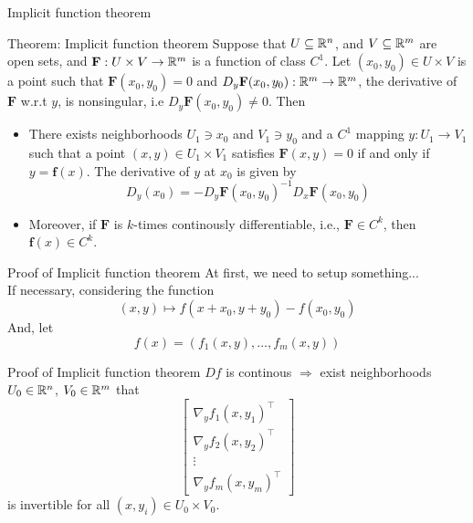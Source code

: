 \begin{frame}{Implicit function theorem}
    \begin{block}{Theorem: Implicit function theorem}
        Suppose that $U \subseteq \mathbb{R}^n$, and $V \subseteq \mathbb{R}^m$ are open sets, and $\mathbf{F}: U \times V \rightarrow \mathbb{R}^m$ is a function of class $C^1$. Let $(x_0, y_0) \in U \times V$ is a point such that $\mathbf{F}(x_0, y_0) = 0$ and $D_y\mathbf{F}(x_0, y_0) : \mathbb{R}^m \rightarrow \mathbb{R}^m$, the derivative of $\mathbf{F}$ w.r.t $y$, is nonsingular, i.e $D_y\mathbf{F}(x_0, y_0) \ne 0$. Then
        \begin{itemize}
            \item There exists neighborhoods $U_1 \ni x_0$ and $V_1 \ni y_0$ and a $C^1$ mapping $y: U_1 \rightarrow V_1$ such that a point $(x, y) \in U_1 \times V_1$ satisfies $\mathbf{F}(x, y) = 0$ if and only if $y = \mathbf{f}(x)$. The derivative of $y$ at $x_0$ is given by
            \begin{equation}
                D_y(x_0) = -D_y\mathbf{F}(x_0, y_0)^{-1}D_x\mathbf{F}(x_0, y_0)
            \end{equation}
            \item Moreover, if $\mathbf{F}$ is $k$-times continously differentiable, i.e., $\mathbf{F} \in C^k$, then $\mathbf{f}(x) \in C^k$.
        \end{itemize}
    \end{block}
\end{frame}

\begin{frame}{Proof of Implicit function theorem}
    At first, we need to setup something...\\
    \vspace{1cm}
    If necessary, considering the function
    \begin{equation}
        (x,y) \mapsto f(x + x_0, y+ y_0) - f(x_0, y_0)
    \end{equation}
    And, let 
    \begin{equation}
        f(x) = (f_1(x, y), \dots, f_m(x, y))
    \end{equation}
\end{frame}

\begin{frame}{Proof of Implicit function theorem}
    $Df$ is continous $\Rightarrow$ exist neighborhoods $U_0 \in \mathbb{R}^n$, $V_0 \in \mathbb{R}^m$ that
    \begin{equation}
        \begin{bmatrix}
        \nabla_yf_1(x, y_1)^{\top}\\ 
        \nabla_yf_2(x, y_2)^{\top}\\ 
        \vdots\\ 
        \nabla_yf_m(x, y_m)^{\top}
        \end{bmatrix}
    \end{equation}
    is invertible for all $(x, y_i) \in U_0 \times V_0$.
\end{frame}

